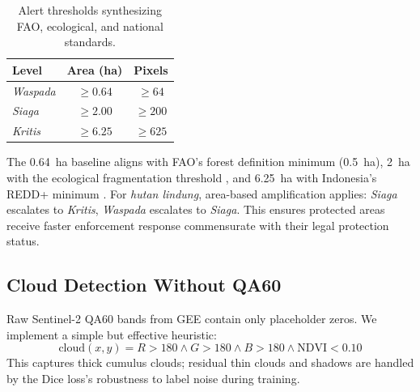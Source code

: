 \documentclass[10pt,a4paper,onecolumn]{article}
\begin{document}
\begin{table}[ht]
\centering
\caption{Alert thresholds synthesizing FAO, ecological, and national
standards.}
\label{tab:thresholds}
\small
\begin{tabular}{lcc}
\toprule
Level & Area (ha) & Pixels \\
\midrule
\textit{Waspada} & $\ge 0.64$ & $\ge 64$ \\
\textit{Siaga}   & $\ge 2.00$ & $\ge 200$ \\
\textit{Kritis}  & $\ge 6.25$ & $\ge 625$ \\
\bottomrule
\end{tabular}
\end{table}

The 0.64~ha baseline aligns with FAO's forest definition minimum
(0.5~ha), 2~ha with the ecological fragmentation threshold
\cite{xu2026nature}, and 6.25~ha with Indonesia's REDD+ minimum
\cite{unfccc2022indonesia}. For \textit{hutan lindung}, area-based
amplification applies: \textit{Siaga} escalates to \textit{Kritis},
\textit{Waspada} escalates to \textit{Siaga}. This ensures protected
areas receive faster enforcement response commensurate with their
legal protection status.

\subsection{Cloud Detection Without QA60}
Raw Sentinel-2 QA60 bands from GEE contain only placeholder zeros.
We implement a simple but effective heuristic:
\[
\text{cloud}(x,y) = R{>}180 \land G{>}180 \land B{>}180
\land \text{NDVI}{<}0.10
\]
This captures thick cumulus clouds; residual thin clouds and
shadows are handled by the Dice loss's robustness to label noise
during training.
\end{document}
